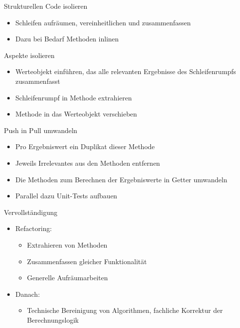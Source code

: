 \begin{frame}[fragile]{Strukturellen Code isolieren}
\begin{itemize}
\item Schleifen aufräumen, vereinheitlichen und zusammenfassen
\item Dazu bei Bedarf Methoden inlinen
\end{itemize}
\end{frame}

\begin{frame}[fragile]{Aspekte isolieren}
\begin{itemize}
\item Werteobjekt einführen, das alle relevanten Ergebnisse des Schleifenrumpfs zusammenfasst
\item Schleifenrumpf in Methode extrahieren
\item Methode in das Werteobjekt verschieben
\end{itemize}
\end{frame}

\begin{frame}[fragile]{Push in Pull umwandeln}
\begin{itemize}
\item Pro Ergebniswert ein Duplikat dieser Methode
\item Jeweils Irrelevantes aus den Methoden entfernen
\item Die Methoden zum Berechnen der Ergebniswerte in Getter umwandeln
\item Parallel dazu Unit-Tests aufbauen
\end{itemize}
\end{frame}

\begin{frame}[fragile]{Vervollständigung}

\begin{itemize}
\item Refactoring: 
\begin{itemize}
\item Extrahieren von Methoden
\item Zusammenfassen gleicher Funktionalität
\item Generelle Aufräumarbeiten
\end{itemize}

\item Danach: 
\begin{itemize}
\item Technische Bereinigung von Algorithmen, fachliche Korrektur der Berechnungslogik
\end{itemize}
\end{itemize}

\end{frame}

